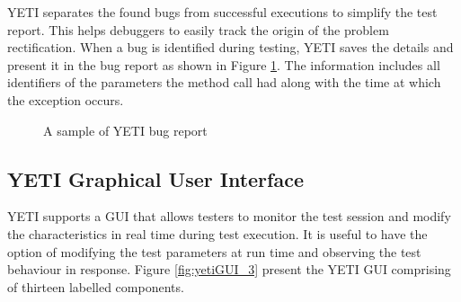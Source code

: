 YETI separates the found bugs from successful executions to simplify the test report. This helps debuggers to easily track the origin of the problem rectification. When a bug is identified during testing, YETI saves the details and present it in the bug report as shown in Figure \ref{bugReport}. The information includes all identifiers of the parameters the method call had along with the time at which the exception occurs.
\bigskip
\begin{figure}[h]
	\centering
	\caption{A sample of YETI bug report}
	\label{bugReport}
\end{figure}

\subsection{YETI Graphical User Interface}
YETI supports a GUI that allows testers to monitor the test session and modify the characteristics in real time during test execution. It is useful to have the option of modifying the test parameters at run time and observing the test behaviour in response. Figure \ref{fig:yetiGUI_3} present the YETI GUI comprising of thirteen labelled components.


